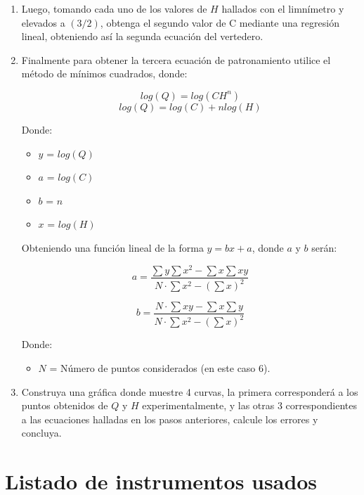 \documentclass[10pt, a4paper]{exam}
\begin{document}
\begin{enumerate}
    \item Luego, tomando cada uno de los valores de $H$ hallados con el limnímetro y elevados a $(3/2)$, obtenga el segundo valor de C mediante una regresión lineal, obteniendo así la segunda ecuación del vertedero.

    \item Finalmente para obtener la tercera ecuación de patronamiento utilice el método de mínimos cuadrados, donde:

    $$log(Q)=log(CH^n)$$
    $$log(Q)=log(C)+nlog(H)$$

    Donde:  

        \begin{itemize}
            \item $y$ = $log(Q)$
            \item $a$ = $log(C)$
            \item $b$ = $n$
            \item $x$ = $log(H)$
        \end{itemize}

    Obteniendo una función lineal de la forma $y=bx+a$, donde $a$ y $b$ serán:

    $$a=\dfrac{\sum y\sum x^2-\sum x\sum xy}{N\cdot\sum x^2-(\sum x)^2}$$

    $$b=\dfrac{N\cdot\sum xy- \sum x\sum y}{N\cdot\sum x^2-(\sum x)^2}$$

    Donde:  

        \begin{itemize}
            \item $N$ = Número de puntos considerados (en este caso 6).
        \end{itemize}

    \item Construya una gráfica donde muestre 4 curvas, la primera corresponderá a los puntos obtenidos de $Q$ y $H$ experimentalmente, y las otras 3 correspondientes a las ecuaciones halladas en los pasos anteriores, calcule los errores y concluya.
    
\end{enumerate}


\section{Listado de instrumentos usados}
\end{document}
